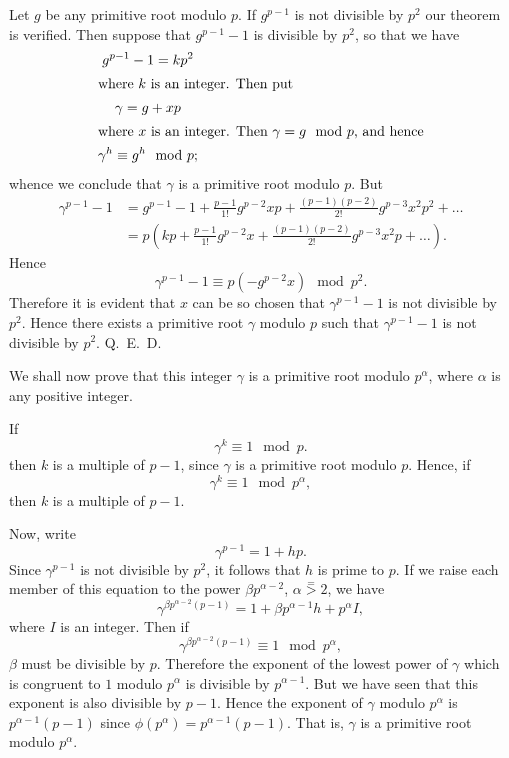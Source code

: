 \documentclass[oneside]{book}
\begin{document}
Let $g$ be any primitive root modulo $p$. If $g^{p-1}$ is not
divisible by $p^2$ our theorem is verified. Then suppose that
$g^{p-1}-1$ is divisible by $p^2$, so that we have
\begin{gather*}
g^{p-1}-1 = kp^2 \\
\intertext{where $k$ is an integer. Then put}
\gamma = g + xp \\
\intertext{where $x$ is an integer. Then $\gamma = g \mod p$, and
hence}
\gamma^h \equiv g^h \mod p;
\end{gather*}
whence we conclude that $\gamma$ is a primitive root modulo $p$. But
\begin{align*}
\gamma^{p-1}-1 &=
     g^{p-1} - 1 + \frac{p-1}{1!}g^{p-2}xp +
        \frac{(p-1)(p-2)}{2!}g^{p-3}x^2p^2 + \ldots \\
  &= p\left(kp + \frac{p-1}{1!}g^{p-2}x +
        \frac{(p-1)(p-2)}{2!}g^{p-3}x^2p + \ldots\right).
\end{align*}
Hence
\begin{equation*}
\gamma^{p-1}-1 \equiv p(-g^{p-2}x) \mod p^2.
\end{equation*}
Therefore it is evident that $x$ can be so chosen that
$\gamma^{p-1}-1$ is not divisible by $p^2$. Hence there exists a
primitive root $\gamma$ modulo $p$ such that $\gamma^{p-1}-1$ is not
divisible by $p^2$. Q.~E.~D.

\smallskip We shall now prove that this integer $\gamma$ is a
primitive root modulo $p^\alpha$, where $\alpha$ is any positive
integer.

If
\begin{equation*}
\gamma^k \equiv 1\mod p.
\end{equation*}
then $k$ is a multiple of $p-1$, since $\gamma$ is a primitive root
modulo $p$. Hence, if
\begin{equation*}
\gamma^k \equiv 1 \mod p^\alpha,
\end{equation*}
then $k$ is a multiple of $p-1$.

Now, write
\begin{equation*}
\gamma^{p-1} = 1 + hp.
\end{equation*}
Since $\gamma^{p-1}$ is not divisible by $p^2$, it follows that $h$
is prime to $p$. If we raise each member of this equation to the
power $\beta p^{\alpha-2}$, $\alpha \stackrel{=}{>}2$, we have
\begin{equation*}
\gamma^{\beta p^{\alpha-2}(p-1)} =
  1 + \beta p^{\alpha-1}h + p^\alpha I,
\end{equation*}
where $I$ is an integer. Then if
\begin{equation*}
\gamma^{\beta p^{\alpha-2}(p-1)} \equiv 1 \mod p^\alpha,
\end{equation*}
$\beta$ must be divisible by $p$. Therefore the exponent of the
lowest power of $\gamma$ which is congruent to $1$ modulo $p^\alpha$
is divisible by $p^{\alpha-1}$. But we have seen that this exponent
is also divisible by $p-1$. Hence the exponent of $\gamma$ modulo
$p^\alpha$ is $p^{\alpha-1}(p-1)$ since $\phi(p^\alpha) =
p^{\alpha-1}(p-1)$. That is, $\gamma$ is a primitive root modulo
$p^\alpha$.
\end{document}
